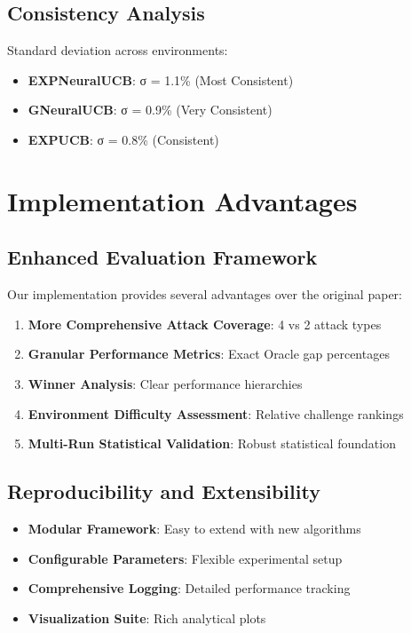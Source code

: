 \documentclass[11pt,a4paper]{article}
\begin{document}
\subsection{Consistency Analysis}

Standard deviation across environments:
\begin{itemize}
    \item \textbf{EXPNeuralUCB}: σ = 1.1\% (Most Consistent)
    \item \textbf{GNeuralUCB}: σ = 0.9\% (Very Consistent)
    \item \textbf{EXPUCB}: σ = 0.8\% (Consistent)
\end{itemize}

\section{Implementation Advantages}

\subsection{Enhanced Evaluation Framework}

Our implementation provides several advantages over the original paper:

\begin{enumerate}
    \item \textbf{More Comprehensive Attack Coverage}: 4 vs 2 attack types
    \item \textbf{Granular Performance Metrics}: Exact Oracle gap percentages
    \item \textbf{Winner Analysis}: Clear performance hierarchies
    \item \textbf{Environment Difficulty Assessment}: Relative challenge rankings
    \item \textbf{Multi-Run Statistical Validation}: Robust statistical foundation
\end{enumerate}

\subsection{Reproducibility and Extensibility}

\begin{itemize}
    \item \textbf{Modular Framework}: Easy to extend with new algorithms
    \item \textbf{Configurable Parameters}: Flexible experimental setup
    \item \textbf{Comprehensive Logging}: Detailed performance tracking
    \item \textbf{Visualization Suite}: Rich analytical plots
\end{itemize}
\end{document}
